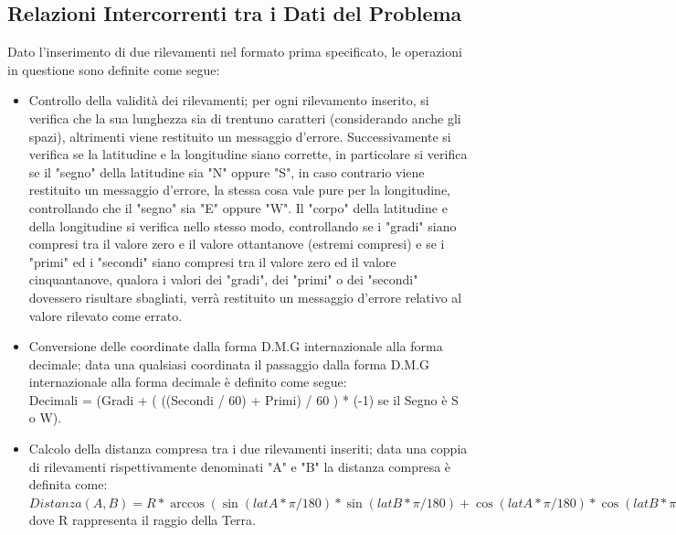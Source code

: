 \documentclass{article}
\begin{document}
\subsection{Relazioni Intercorrenti tra i Dati del Problema}
Dato l'inserimento di due rilevamenti nel formato prima specificato, le operazioni in questione sono definite come segue:
\begin{itemize}
	\item Controllo della validità dei rilevamenti; per ogni rilevamento inserito, si verifica che la sua lunghezza sia di trentuno caratteri (considerando anche gli spazi), altrimenti viene restituito un messaggio d'errore. Successivamente si verifica se la latitudine e la longitudine siano corrette, in particolare si verifica se il "segno" della latitudine sia "N" oppure "S", in caso contrario viene restituito un messaggio d'errore, la stessa cosa vale pure per la longitudine, controllando che il "segno" sia "E" oppure "W". Il "corpo" della latitudine e della longitudine si verifica nello stesso modo, controllando se i "gradi" siano compresi tra il valore zero e il valore ottantanove (estremi compresi) e se i "primi" ed i "secondi" siano compresi tra il valore zero ed il valore cinquantanove, qualora i valori dei "gradi", dei "primi" o dei "secondi" dovessero risultare sbagliati, verrà restituito un messaggio d'errore relativo al valore rilevato come errato.
	
	\item Conversione delle coordinate dalla forma D.M.G internazionale alla forma decimale; data una qualsiasi coordinata il passaggio dalla forma D.M.G internazionale alla forma decimale è definito come segue: \\
	Decimali = (Gradi + ( ((Secondi / 60) + Primi) / 60 ) * (-1) se il Segno è  S o W).
	
	\item Calcolo della distanza compresa tra i due rilevamenti inseriti;  data una coppia di rilevamenti rispettivamente denominati "A" e "B" la distanza compresa è definita come: \\
	$Distanza(A, B) = R * \arccos(\sin(latA * \pi / 180) * \sin(latB * \pi / 180) + \cos(latA * \pi / 180) * \cos(latB * \pi / 180) * \cos((lonA - lonB) * \pi / 180)). $\\
	dove R rappresenta il raggio della Terra.
	

\end{itemize}
\end{document}
